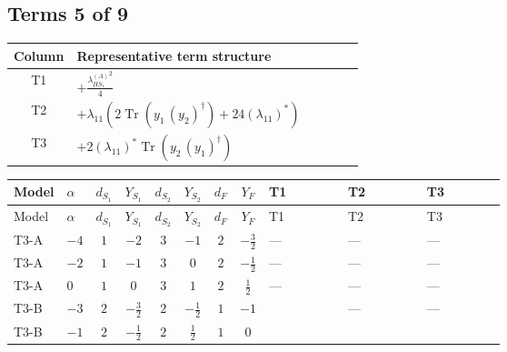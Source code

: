 \documentclass[8pt]{article}
\begin{document}
\begin{landscape}
\subsection*{Terms 5 of 9}
\begin{center}
\begin{tabular}{@{}c >{\raggedright\arraybackslash}p{0.82\linewidth}@{}}
\toprule
Column & Representative term structure \\
\midrule
T1 & \(\displaystyle +\frac{{\lambda_{HS_1}^{(A)}}^2}{4}\) \\
\midrule
T2 & \(\displaystyle +{\lambda_{11}} (2 \operatorname{Tr}\!\left({y_1}\,\left({y_2}\right)^{\dagger}\right)+24 \left({\lambda_{11}}\right)^{*})\) \\
\midrule
T3 & \(\displaystyle +2 \left({\lambda_{11}}\right)^{*} \operatorname{Tr}\!\left({y_2}\,\left({y_1}\right)^{\dagger}\right)\) \\
\midrule
\bottomrule
\end{tabular}
\end{center}
\smallskip
\tiny
\begin{longtable}{@{}llcccccc >{\raggedright\arraybackslash}p{0.21\linewidth} >{\raggedright\arraybackslash}p{0.21\linewidth} >{\raggedright\arraybackslash}p{0.21\linewidth}@{}}
\toprule
Model & $\alpha$ & $d_{S_1}$ & $Y_{S_1}$ & $d_{S_2}$ & $Y_{S_2}$ & $d_F$ & $Y_F$ & T1 & T2 & T3 \\
\midrule
\endfirsthead
\toprule
Model & $\alpha$ & $d_{S_1}$ & $Y_{S_1}$ & $d_{S_2}$ & $Y_{S_2}$ & $d_F$ & $Y_F$ & T1 & T2 & T3 \\
\midrule
\endhead
T3-A & $-4$ & $1$ & $-2$ & $3$ & $-1$ & $2$ & $-\frac{3}{2}$ & --- & --- & --- \\
\midrule
T3-A & $-2$ & $1$ & $-1$ & $3$ & $0$ & $2$ & $-\frac{1}{2}$ & --- & --- & --- \\
\midrule
T3-A & $0$ & $1$ & $0$ & $3$ & $1$ & $2$ & $\frac{1}{2}$ & --- & --- & --- \\
\midrule
T3-B & $-3$ & $2$ & $-\frac{3}{2}$ & $2$ & $-\frac{1}{2}$ & $1$ & $-1$ & \scriptsize\adjustbox{max width=\linewidth}{$\begin{gathered} +\frac{{\lambda_{HS_1}^{(A)}}^2}{4}\end{gathered}$} & --- & --- \\
\midrule
T3-B & $-1$ & $2$ & $-\frac{1}{2}$ & $2$ & $\frac{1}{2}$ & $1$ & $0$ & \scriptsize\adjustbox{max width=\linewidth}{$\begin{gathered} +\frac{{\lambda_{HS_1}^{(A)}}^2}{4}\end{gathered}$} & \scriptsize\adjustbox{max width=\linewidth}{$\begin{gathered} +{\lambda_{11}} (2 \operatorname{Tr}\!\left({y_1}\,\left({y_2}\right)^{\dagger}\right)+24 \left({\lambda_{11}}\right)^{*})\end{gathered}$} & \scriptsize\adjustbox{max width=\linewidth}{$\begin{gathered} +2 \left({\lambda_{11}}\right)^{*} \operatorname{Tr}\!\left({y_2}\,\left({y_1}\right)^{\dagger}\right)\end{gathered}$} \\

\end{longtable}
\end{landscape}
\end{document}

